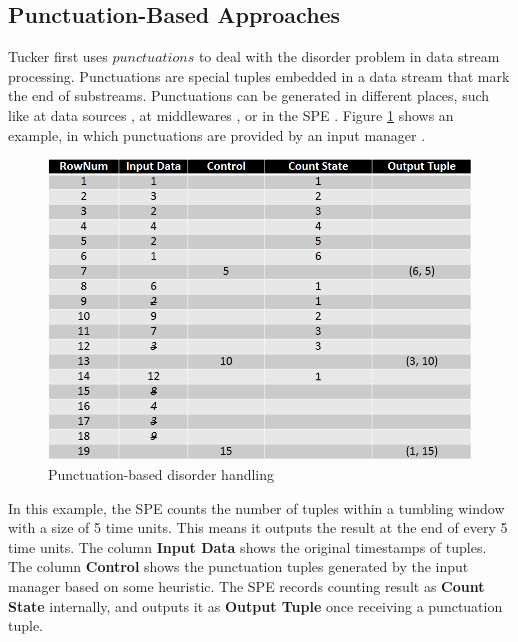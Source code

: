 \documentclass[a4paper, 11pt, twoside]{report}
\begin{document}
\subsection{Punctuation-Based Approaches}
\label{subsec:punctuation based approaches}

Tucker \cite{tucker2005punctuated} first uses $punctuations$ to deal with the disorder problem in data stream processing. Punctuations are special tuples embedded in a data stream that mark the end of substreams. Punctuations can be generated in different places, such like at data sources \cite{tucker2005punctuated}\cite{abadi2003aurora}, at middlewares \cite{krishnamurthy2010continuous}, or in the SPE \cite{li2005semantics}. Figure \ref{fig:punctuation-base} shows an example, in which punctuations are provided by an input manager \cite{krishnamurthy2010continuous}.\\

\begin{figure}[h]
\centering
\includegraphics[scale=0.55]{punctuation-base}
\caption{Punctuation-based disorder handling \cite{krishnamurthy2010continuous} \label{fig:punctuation-base}}
\end{figure}

In this example, the SPE counts the number of tuples within a tumbling window with a size of 5 time units. This means it outputs the result at the end of every 5 time units. The column \textbf{Input Data} shows the original timestamps of tuples. The column \textbf{Control} shows the punctuation tuples generated by the input manager based on some heuristic. The SPE records counting result as \textbf{Count State} internally, and outputs it as \textbf{Output Tuple} once receiving a punctuation tuple.\\
\end{document}
